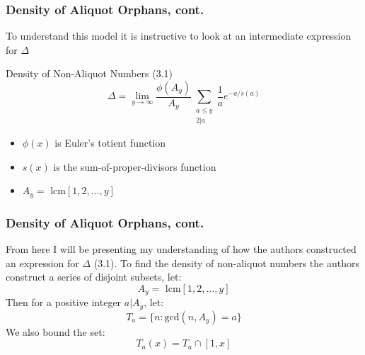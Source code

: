 \documentclass{beamer}
\begin{document}


\begin{frame}
\frametitle{Density of Aliquot Orphans, cont.}
To understand this model it is instructive to look at an intermediate expression for $\Delta$
\begin{block}{Density of Non-Aliquot Numbers (3.1)}
$$\Delta = \lim_{y \to \infty} \frac{\phi(A_y)}{A_y} \sum_{\substack{a\leq y \\ 2 | a}} \frac{1}{a} e^{-a/s(a)}$$
\end{block}
\begin{itemize}
    \item $\phi(x)$ is Euler's totient function 
    \item $s(x)$ is the sum-of-proper-divisors function
    \item $A_y = \text{ lcm}[1, 2, ..., y]$
\end{itemize}
\end{frame}




\begin{frame}
\frametitle{Density of Aliquot Orphans, cont.}
From here I will be presenting my understanding of how the authors constructed an expression for $\Delta$ (3.1).\linebreak
\linebreak
To find the density of non-aliquot numbers the authors construct a series of disjoint subsets, let:
$$A_y = \text{ lcm}[1, 2, ..., y]$$
Then for a positive integer $a | A_y$, let:
$$T_a = \{n : \text{gcd}(n, A_y) = a\}$$
We also bound the set: $$T_a(x) = T_a \cap [1,x]$$
\end{frame}
\end{document}
